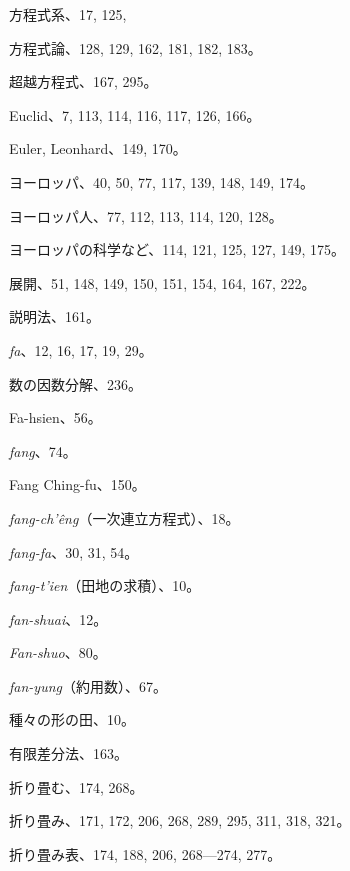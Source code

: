 \documentclass[11pt]{article}
\begin{document}
方程式系、17, 125,\par
方程式論、128, 129, 162, 181, 182, 183。\par
超越方程式、167, 295。\par
Euclid、7, 113, 114, 116, 117, 126, 166。\par
Euler, Leonhard、149, 170。\par
ヨーロッパ、40, 50, 77, 117, 139, 148, 149, 174。\par
ヨーロッパ人、77, 112, 113, 114, 120, 128。\par
ヨーロッパの科学など、114, 121, 125, 127, 149, 175。\par
展開、51, 148, 149, 150, 151, 154, 164, 167, 222。\par
説明法、161。\par
\medskip
\emph{fa}、12, 16, 17, 19, 29。\par
数の因数分解、236。\par
Fa-hsien、56。\par
\emph{fang}、74。\par
Fang Ching-fu、150。\par
\emph{fang-ch'êng}（一次連立方程式）、18。\par
\emph{fang-fa}、30, 31, 54。\par
\emph{fang-t'ien}（田地の求積）、10。\par
\emph{fan-shuai}、12。\par
\emph{Fan-shuo}、80。\par
\emph{fan-yung}（約用数）、67。\par
種々の形の田、10。\par
有限差分法、163。\par
折り畳む、174, 268。\par
折り畳み、171, 172, 206, 268, 289, 295, 311, 318, 321。\par
折り畳み表、174, 188, 206, 268—274, 277。\par
\end{document}
